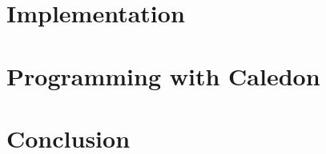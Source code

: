 \documentclass[hyperref={pdfpagelabels=false}]{beamer}
\begin{document}
\section{Implementation}
%    
%    
%     
%    
%    
 
\section{Programming with Caledon}
%    
%    
  
\section{Conclusion}
%   
%   





\end{document}
